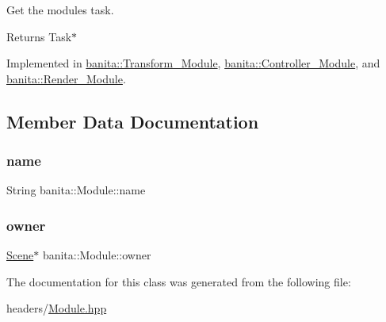 Get the module\textquotesingle{}s task. 

\begin{DoxyReturn}{Returns}
Task$\ast$ 
\end{DoxyReturn}


Implemented in \mbox{\hyperlink{classbanita_1_1_transform___module_a6cee3919fd2b22f82c41f056ac87e546}{banita\+::\+Transform\+\_\+\+Module}}, \mbox{\hyperlink{classbanita_1_1_controller___module_a8868454d67a5f949b401c9cfc0a12eba}{banita\+::\+Controller\+\_\+\+Module}}, and \mbox{\hyperlink{classbanita_1_1_render___module_a0fbb9b466fa3fd8f55a0898a4aa87bd0}{banita\+::\+Render\+\_\+\+Module}}.



\subsection{Member Data Documentation}
\mbox{\label{classbanita_1_1_module_a7295535148079c57f3ab6b4e77908cc5}} 
\subsubsection{\texorpdfstring{name}{name}}
{\footnotesize\ttfamily String banita\+::\+Module\+::name\hspace{0.3cm}{\ttfamily [protected]}}

\mbox{\label{classbanita_1_1_module_a10a833e8e5e1d2fb732f1aacaea32f30}} 
\subsubsection{\texorpdfstring{owner}{owner}}
{\footnotesize\ttfamily \mbox{\hyperlink{classbanita_1_1_scene}{Scene}}$\ast$ banita\+::\+Module\+::owner\hspace{0.3cm}{\ttfamily [protected]}}



The documentation for this class was generated from the following file\+:\begin{DoxyCompactItemize}
\item 
headers/\mbox{\hyperlink{_module_8hpp}{Module.\+hpp}}\end{DoxyCompactItemize}
